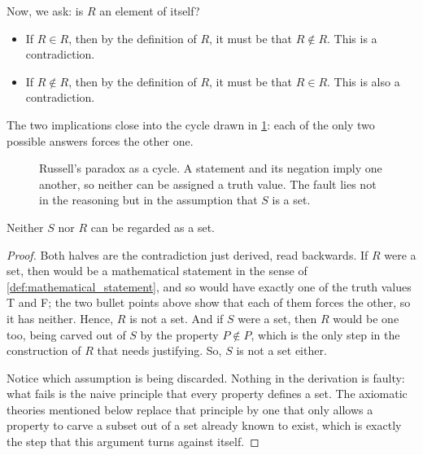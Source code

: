 Now, we ask: is $R$ an element of itself?
\begin{itemize}
    \item If $R \in R$, then by the definition of $R$, it must be that $R \notin R$. This is a contradiction.
    \item If $R \notin R$, then by the definition of $R$, it must be that $R \in R$. This is also a contradiction.
\end{itemize}
The two implications close into the cycle drawn in \cref{fig:russell_cycle}: each of the only two possible answers forces the other one.

\begin{figure}[ht!]
  \centering
  \caption{Russell's paradox as a cycle. A statement and its negation imply one another, so neither can be assigned a truth value. The fault lies not in the reasoning but in the assumption that $S$ is a set.}
  \label{fig:russell_cycle}
\end{figure}

\begin{claim*}
\label{claim:russell_no_set}
Neither $S$ nor $R$ can be regarded as a set.
\end{claim*}

\begin{proof}
Both halves are the contradiction just derived, read backwards. If $R$ were a set, then  would be a mathematical statement in the sense of \cref{def:mathematical_statement}, and so would have exactly one of the truth values T and F; the two bullet points above show that each of them forces the other, so it has neither. Hence, $R$ is not a set. And if $S$ were a set, then $R$ would be one too, being carved out of $S$ by the property $P \notin P$, which is the only step in the construction of $R$ that needs justifying. So, $S$ is not a set either.

Notice which assumption is being discarded. Nothing in the derivation is faulty: what fails is the naive principle that every property defines a set. The axiomatic theories mentioned below replace that principle by one that only allows a property to carve a subset out of a set already known to exist, which is exactly the step that this argument turns against itself.
\end{proof}

